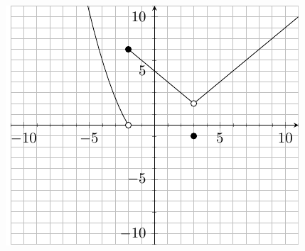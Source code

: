 \documentclass[11pt]{article}
\begin{document}
\begin{minipage}{\linewidth}%
\centering
\makebox[\linewidth]{}
\includegraphics{finalgraph1.pdf}
\label{graph1exam1}%
\end{minipage}
\end{document}
